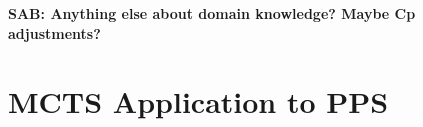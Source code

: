 \documentclass[letterpaper]{article}
\begin{document}
{\bf SAB: Anything else about domain knowledge? Maybe Cp adjustments?}

%
%
%

\section{MCTS Application to PPS}
\end{document}
